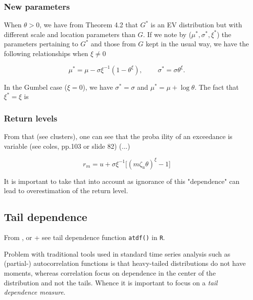 \subsubsection*{New parameters} When $\theta>0$, we have from Theorem 4.2 that $G^*$ is an EV distribution but with different scale and location parameters than $G$. If we note by ($\mu^*,\sigma^*,\xi^*$) the parameters pertaining to $G^*$ and those from $G$ kept in the usual way, we have the following relationships when $\xi\neq 0$

\begin{equation}
\mu^* = \mu-\sigma\xi^{-1}(1-\theta^{\xi}), \ \ \ \ \ \ \ \ \ \ \sigma^*=\sigma\theta^{\xi}.
\end{equation}

In the Gumbel case ($\xi=0$), we have $\sigma^*=\sigma$ and $\mu^*=\mu+\log\theta$.
The fact that $\xi^*=\xi$ is 

\subsubsection*{Return levels}

From that (see clusters), one can see that the proba ility of an exceedance is variable (see coles, pp.103 or slide 82) (...)

\begin{equation}
r_m = u + \sigma\xi^{-1}\Big[(m\zeta_u\theta)^{\xi}-1\Big]
\end{equation}

It is important to take that into account as ignorance of this "dependence" can lead to overestimation of the return level.

\subsection{Tail dependence}
From \cite[section 2.6]{reiss_statistical_2007}, \cite[section 8.4]{coles_introduction_2001} or \cite[section 9.4.1,10.3.4]{beirlant_practical_1996} + see tail dependence function \texttt{atdf()} in \texttt{R}.

Problem with traditional tools used in standard time series analysis such as (partial-) autocorrelation functions is that heavy-tailed distributions do not have moments, whereas correlation focus on dependence in the center of the distribution and not the tails. \citet[pp.134]{wada_extreme_2016} Whence it is important to focus on a \textit{tail dependence measure}.

